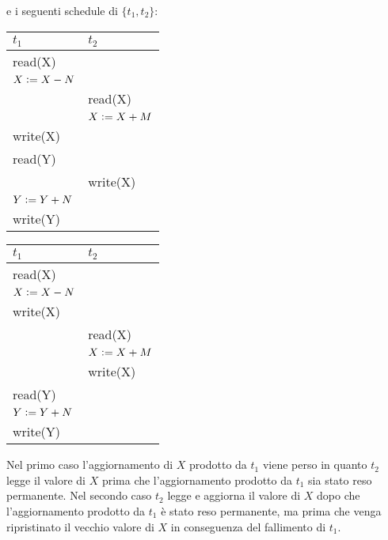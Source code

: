  e i seguenti schedule di $\{t_1 ,t_2\}$:

 \begin{multicols}{2}   
 \begin{tabular}{|l|l|}
 \hline
 $t_1$ & $t_2$\\
 \hline
     read(X) & \\ 
     $X\vcentcolon=X-N$ & \\ 
      & read(X)\\
      & $X\vcentcolon=X+M$\\ 
     write(X) &\\ 
     read(Y) &\\
      & write(X)\\
     $Y\vcentcolon=Y+N$ &\\
     write(Y)&\\
     \hline
    \end{tabular}
    
   \begin{tabular}{|l|l|}
     \hline
     $t_1$ & $t_2$\\
     \hline
     read(X) & \\ 
     $X\vcentcolon=X-N$ & \\ 
     write(X) &\\ 
      & read(X)\\
      & $X\vcentcolon=X+M$\\ 
      & write(X)\\
     read(Y) &\\
     $Y\vcentcolon=Y+N$ &\\
     write(Y)&\\
     \hline
    \end{tabular}
    
    
  \end{multicols}

Nel primo caso l'aggiornamento di $X$ prodotto da $t_1$ viene perso in quanto $t_2$ legge il valore di $X$
prima che l'aggiornamento prodotto da $t_1$ sia stato reso permanente. Nel secondo caso $t_2$ legge e
aggiorna il valore di $X$ dopo che l'aggiornamento prodotto da $t_1$ è stato reso permanente, ma prima
che venga ripristinato il vecchio valore di $X$ in conseguenza del fallimento di $t_1$.\\

